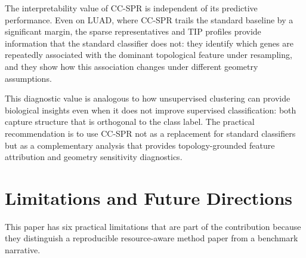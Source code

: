 \documentclass[11pt]{article}
\begin{document}
The interpretability value of CC-SPR is independent of its predictive performance.
Even on LUAD, where CC-SPR trails the standard baseline by a significant margin, the sparse representatives and TIP profiles provide information that the standard classifier does not: they identify which genes are repeatedly associated with the dominant topological feature under resampling, and they show how this association changes under different geometry assumptions.

This diagnostic value is analogous to how unsupervised clustering can provide biological insights even when it does not improve supervised classification: both capture structure that is orthogonal to the class label.
The practical recommendation is to use CC-SPR not as a replacement for standard classifiers but as a complementary analysis that provides topology-grounded feature attribution and geometry sensitivity diagnostics.

\section{Limitations and Future Directions}
\label{sec:limitations}

This paper has six practical limitations that are part of the contribution because they distinguish a reproducible resource-aware method paper from a benchmark narrative.
\end{document}
